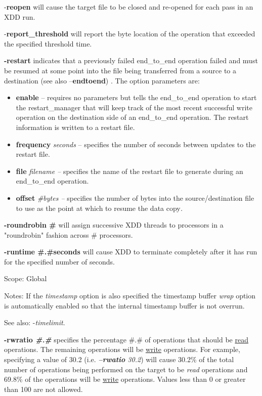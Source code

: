 -\textbf{reopen} will cause the target file to be closed and re-opened for each pass in an XDD run.

-\textbf{report\_threshold} will report the byte location of the operation that exceeded the specified threshold time.

\textbf{-restart} indicates that a previously failed end\_to\_end operation failed and must be resumed at some point into the file being transferred from a source to a destination (see also --\textbf{endtoend}) . The option parameters are:

\begin{itemize}
\item
  \textbf{enable} -- requires no parameters but tells the end\_to\_end operation to start the restart\_manager that will keep track of the most recent successful write operation on the destination side of an end\_to\_end operation. The restart information is written to a restart file.
\item
  \textbf{frequency} \emph{seconds} -- specifies the number of seconds between updates to the restart file.
\item
  \textbf{file} \emph{filename --} specifies the name of the restart file to generate during an end\_to\_end operation.
\item
  \textbf{offset} \emph{\#bytes --} specifies the number of bytes into the source/destination file to use as the point at which to resume the data copy\emph{.}
\end{itemize}

\textbf{-roundrobin \#} will assign successive XDD threads to processors in a "roundrobin" fashion across \# processors.

\textbf{-runtime \#.\#seconds} will cause XDD to terminate completely after it has run for the specified number of seconds.

Scope: Global

Notes: If the \emph{timestamp} option is also specified the timestamp buffer \emph{wrap} option is automatically enabled so that the internal timestamp buffer is not overrun.

See also: -\emph{timelimit}.

\textbf{-rwratio \emph{\#.\#}} specifies the percentage \#.\# of operations that should be \ul{read} operations. The remaining operations will be \ul{write} operations. For example, specifying a value of 30.2 (i.e. \emph{\textbf{--rwatio} 30.2}) will cause 30.2\% of the total number of operations being performed on the target to be \emph{read} operations and 69.8\% of the operations will be \ul{write} operations. Values less than 0 or greater than 100 are not allowed.

